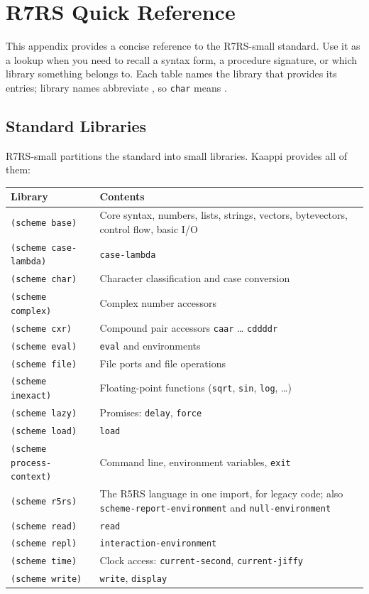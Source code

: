 \chapter{R7RS Quick Reference}
\label{app:r7rs}

This appendix provides a concise reference to the R7RS-small standard. Use it as a lookup when you need to recall a syntax form, a procedure signature, or which library something belongs to. Each table names the library that provides its entries; library names abbreviate , so \texttt{char} means .

\section{Standard Libraries}

R7RS-small partitions the standard into small libraries. Kaappi provides all of them:

\begin{center}
\small
\begin{tabularx}{\textwidth}{@{}lY@{}}
\textbf{Library} & \textbf{Contents} \\
\hline
\texttt{(scheme base)} & Core syntax, numbers, lists, strings, vectors, bytevectors, control flow, basic I/O \\
\texttt{(scheme case-lambda)} & \texttt{case-lambda} \\
\texttt{(scheme char)} & Character classification and case conversion \\
\texttt{(scheme complex)} & Complex number accessors \\
\texttt{(scheme cxr)} & Compound pair accessors \texttt{caar} \ldots{} \texttt{cddddr} \\
\texttt{(scheme eval)} & \texttt{eval} and environments \\
\texttt{(scheme file)} & File ports and file operations \\
\texttt{(scheme inexact)} & Floating-point functions (\texttt{sqrt}, \texttt{sin}, \texttt{log}, \ldots) \\
\texttt{(scheme lazy)} & Promises: \texttt{delay}, \texttt{force} \\
\texttt{(scheme load)} & \texttt{load} \\
\texttt{(scheme process-context)} & Command line, environment variables, \texttt{exit} \\
\texttt{(scheme r5rs)} & The R5RS language in one import, for legacy code; also \texttt{scheme-report-environment} and \texttt{null-environment} \\
\texttt{(scheme read)} & \texttt{read} \\
\texttt{(scheme repl)} & \texttt{interaction-environment} \\
\texttt{(scheme time)} & Clock access: \texttt{current-second}, \texttt{current-jiffy} \\
\texttt{(scheme write)} & \texttt{write}, \texttt{display} \\
\end{tabularx}
\end{center}

